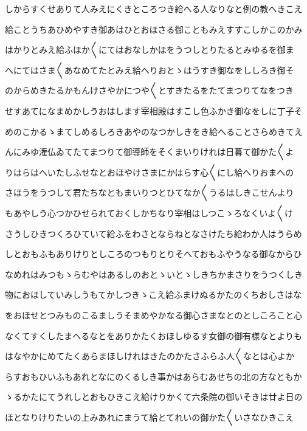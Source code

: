 \documentclass[a4paper,11pt,landscape]{ltjtarticle}
\begin{document}
\par\medskip
しからすくせありて人みえにくきところつき給へる人なりなと例の教へきこえ
\par\medskip
給ことうちあひめやすき御あはひとおほさる御こともみえすすこしかこのかみ
\par\medskip
はかりとみえ給ふほか〱にてはおなしかほをうつしとりたるとみゆるを御ま
\par\medskip
へにてはさま〱あなめてたとみえ給へりおとゝはうすき御なをししろき御そ
\par\medskip
のからめきたるかもんけさやかにつや〱とすきたるをたてまつりてなをつき
\par\medskip
せすあてになまめかしうおはします宰相殿はすこし色ふかき御なをしに丁子そ
\par\medskip
めのこかるゝまてしめるしろきあやのなつかしきをき給へることさらめきてえ
\par\medskip
んにみゆ潅仏ゐてたてまつりて御導師をそくまいりけれは日暮て御かた〱よ
\par\medskip
りはらはへいたしふせなとおほやけさまにかはらす心〱にし給へりおまへの
\par\medskip
さほうをうつして君たちなともまいりつとひてなか〱うるはしきこせんより
\par\medskip
もあやしう心つかひせられておくしかちなり宰相はしつこゝろなくいよ〱け
\par\medskip
さうしひきつくろひていて給ふをわさとならねとなさけたち給わか人はうらめ
\par\medskip
しとおもふもありけりとしころのつもりとりそへておもふやうなる御なからひ
\par\medskip
なめれはみつもゝらむやはあるしのおとゝいとゝしきちかまさりをうつくしき
\par\medskip
物におほしていみしうもてかしつきゝこえ給ふまけぬるかたのくちおしさはな
\par\medskip
をおほせとつみものこるましうそまめやかなる御心さまなとのとしころこと心
\par\medskip
なくてすくしたまへるなとをありかたくおほしゆるす女御の御有様なとよりも
\par\medskip
はなやかにめてたくあらまほしけれはきたのかたさふらふ人〱なとは心よか
\par\medskip
らすおもひいふもあれとなにのくるしき事かはあらむあせちの北の方なともか
\par\medskip
ゝるかたにてうれしとおもひきこえ給けりかくて六条院の御いそきは廿よ日の
\par\medskip
ほとなりけりたいの上みあれにまうて給とてれいの御かた〱いさなひきこえ
\par\medskip
\end{document}
